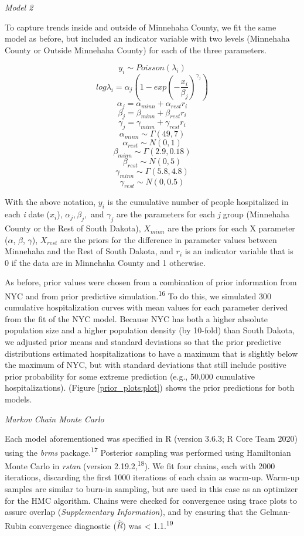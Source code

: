 \documentclass[
]{article}
\begin{document}
\emph{Model 2}

To capture trends inside and outside of Minnehaha County, we fit the same model as before, but included an indicator variable with two levels (Minnehaha County or Outside Minnehaha County) for each of the three parameters.

\[y_i \sim Poisson(\lambda_i)\]
\[log\lambda_i = \alpha_j\left(1 - exp\left(-\frac{x_i}{\beta_j}\right)^{\gamma_j}\right)\]
\[\alpha_j = \alpha_{minn} + \alpha_{rest}r_i\]
\[\beta_j = \beta_{minn} + \beta_{rest}r_i\]
\[\gamma_j = \gamma_{minn} + \gamma_{rest}r_i\]
\[\alpha_{minn} \sim \Gamma(49,7)\]
\[\alpha_{rest} \sim N(0,1)\]
\[\beta_{minn} \sim \Gamma(2.9, 0.18)\]
\[\beta_{rest} \sim N(0, 5)\]
\[\gamma_{minn} \sim \Gamma(5.8, 4.8)\]
\[\gamma_{rest} \sim N(0,0.5)\]

With the above notation, \(y_i\) is the cumulative number of people hospitalized in each \emph{i} date (\(x_i\)), \(\alpha_j, \beta_j,\) and \(\gamma_j\) are the parameters for each \emph{j} group (Minnehaha County or the Rest of South Dakota), \(X_{minn}\) are the priors for each X parameter (\(\alpha\), \(\beta\), \(\gamma\)), \(X_{rest}\) are the priors for the difference in parameter values between Minnehaha and the Rest of South Dakota, and \(r_i\) is an indicator variable that is 0 if the data are in Minnehaha County and 1 otherwise.

As before, prior values were chosen from a combination of prior information from NYC and from prior predictive simulation.\textsuperscript{16} To do this, we simulated 300 cumulative hospitalization curves with mean values for each parameter derived from the fit of the NYC model. Because NYC has both a higher absolute population size and a higher population density (by 10-fold) than South Dakota, we adjusted prior means and standard deviations so that the prior predictive distributions estimated hospitalizations to have a maximum that is slightly below the maximum of NYC, but with standard deviations that still include positive prior probability for some extreme prediction (e.g., 50,000 cumulative hospitalizations). (Figure \ref{prior_plots:plot}) shows the prior predictions for both models.

\emph{Markov Chain Monte Carlo}

Each model aforementioned was specified in R (version 3.6.3; R Core Team 2020) using the \emph{brms} package.\textsuperscript{17} Posterior sampling was performed using Hamiltonian Monte Carlo in \emph{rstan} (version 2.19.2,\textsuperscript{18}). We fit four chains, each with 2000 iterations, discarding the first 1000 iterations of each chain as warm-up. Warm-up samples are similar to burn-in sampling, but are used in this case as an optimizer for the HMC algorithm. Chains were checked for convergence using trace plots to assure overlap (\emph{Supplementary Information}), and by ensuring that the Gelman-Rubin convergence diagnostic (\(\hat{R}\)) was \textless{} 1.1.\textsuperscript{19}
\end{document}
